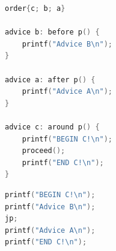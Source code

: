 \documentclass[a4paper]{report}
\begin{document}
\begin{minipage}{0.42\textwidth}
\begin{lstlisting}[language=C, caption=An example of a non-trivial order, label=lst:SmallC_OrderExample]
order{c; b; a}

advice b: before p() {
	printf("Advice B\n");
}

advice a: after p() {
	printf("Advice A\n");
}

advice c: around p() {
	printf("BEGIN C!\n");
	proceed();
	printf("END C!\n");
}
\end{lstlisting}
\end{minipage}\hfill
\begin{minipage}{0.42\textwidth}
\begin{lstlisting}[language=C, caption=The result of the order, label=lst:SmallC_OrderExampleResult]
printf("BEGIN C!\n");
printf("Advice B\n");
jp;
printf("Advice A\n");
printf("END C!\n");
\end{lstlisting}
\end{minipage}\\
\end{document}
